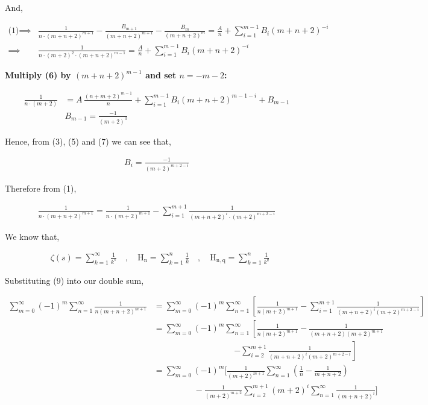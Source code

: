 \documentclass[12pt, a4paper]{article}
\begin{document}
And,

\begin{align*}
    \text{(1)} \implies 
    & \frac{1}{n \cdot (m+n+2)^{m+1}} - \frac{B_{m+1}}{(m+n+2)^{m+1}} - \frac{B_{m}}{(m+n+2)^{m}} = \frac{A}{n} + \sum_{i = 1}^{m-1} B_i(m+n+2)^{-i} \\
    \implies & \frac{1}{n \cdot (m+2)^2 \cdot (m+n+2)^{m-1}} = \frac{A}{n} + \sum_{i = 1}^{m-1} B_i(m+n+2)^{-i} \tag{6}
\end{align*}

\noindent\textbf{Multiply (6) by $(m+n+2)^{m-1}$ and set $n = -m-2$:}

\begin{align*}
    \frac{1}{n \cdot (m+2)} &= A \, \frac{(n+m+2)^{m-1}}{n} + \sum_{i = 1}^{m-1} B_i(m+n+2)^{m-1-i} + B_{m-1} \\
    &B_{m-1}= \frac{-1}{(m+2)^3} \tag{7}
\end{align*}

Hence, from (3), (5) and (7) we can see that,

\begin{align*}
    B_i = \frac{-1}{(m+2)^{m+2-i}} \tag{8}
\end{align*}

Therefore from (1),

\begin{align*}
    \frac{1}{n \cdot (m+n+2)^{m+1}} = \frac{1}{n \cdot (m+2)^{m+1}} - \sum_{i = 1}^{m+1} \frac{1}{(m+n+2)^i \cdot (m+2)^{m+2-i}} \tag{9}
\end{align*}

We know that,

\begin{align*}
    & \zeta (s) = \sum_{k=1}^{\infty} \frac{1}{k^s} \quad , \quad \mathrm{H_n} = \sum_{k=1}^{n} \frac{1}{k} \quad , \quad \mathrm{H_{n,q}} = \sum_{k=1}^{n} \frac{1}{k^q}
\end{align*}

Substituting (9) into our double sum,

\begin{align*}
    \sum_{m=0}^{\infty} (-1)^m \sum_{n=1}^{\infty} \frac{1}{n (m+n+2)^{m+1}}
    &= \sum_{m=0}^{\infty} (-1)^m \sum_{n=1}^{\infty}
    \left[
        \frac{1}{n (m+2)^{m+1}}
        - \sum_{i = 1}^{m+1}
        \frac{1}{(m+n+2)^i (m+2)^{m+2-i}}
    \right] \\[6pt]
    &= \sum_{m=0}^{\infty} (-1)^m \sum_{n=1}^{\infty}
    \left[
        \frac{1}{n (m+2)^{m+1}}
        - \frac{1}{(m+n+2)(m+2)^{m+1}}
    \right. \\
    &\hspace{4cm}\left.
        - \sum_{i = 2}^{m+1}
        \frac{1}{(m+n+2)^i (m+2)^{m+2-i}}
    \right] \\[6pt]
    &= \sum_{m=0}^{\infty} (-1)^m
    \Bigg[
        \frac{1}{(m+2)^{m+1}}
        \sum_{n=1}^{\infty}
        \left( \frac{1}{n} - \frac{1}{m+n+2} \right)
    \\
    &\hspace{2cm}
        - \frac{1}{(m+2)^{m+2}}
        \sum_{i = 2}^{m+1} (m+2)^i
        \sum_{n=1}^{\infty}
        \frac{1}{(m+n+2)^i}
    \Bigg]
\end{align*}
\end{document}
